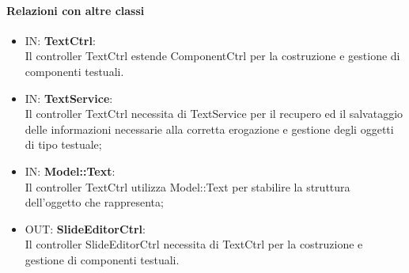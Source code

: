 \paragraph{Relazioni con altre classi}
\begin{itemize}
	\item IN: \textbf{TextCtrl}:\\
	Il controller TextCtrl estende ComponentCtrl per la costruzione e gestione di componenti testuali.
	\item IN: \textbf{TextService}:\\
	Il controller TextCtrl necessita di TextService per il recupero ed il salvataggio delle informazioni necessarie alla corretta erogazione e gestione degli oggetti di tipo testuale;
	\item IN: \textbf{Model::Text}:\\
	Il controller TextCtrl utilizza Model::Text per stabilire la struttura dell'oggetto che rappresenta;
	\item OUT: \textbf{SlideEditorCtrl}:\\
	Il controller SlideEditorCtrl necessita di TextCtrl per la costruzione e gestione di componenti testuali.
\end{itemize}

\newpage

